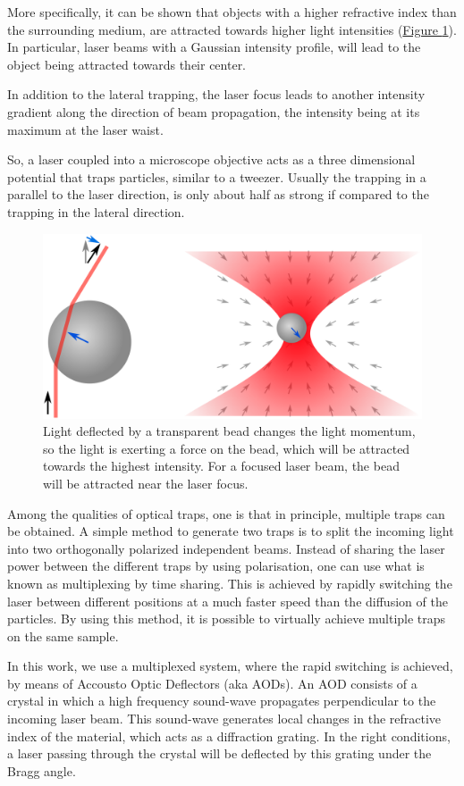 \documentclass[A4paperpaper,11pt,english]{sphinxmanual}
\begin{document}
More specifically, it can be shown that objects with a higher refractive
index than the surrounding medium, are attracted towards higher light intensities
(\hyperref[parts/part1:setup]{Figure  \ref*{parts/part1:setup}}).  In particular, laser beams with a Gaussian intensity
profile, will lead to the object being attracted towards their center.

In addition to the lateral trapping, the laser focus leads to
another intensity gradient along the direction of beam propagation, the intensity being at its maximum at the laser waist.

So, a laser coupled into a microscope objective acts as a three dimensional
potential that traps particles, similar to a tweezer. Usually the trapping in
a parallel to the laser direction, is only about half as strong if compared to the trapping in the
lateral direction.
\begin{figure}[htbp]
\centering
\capstart

\includegraphics[width=0.700\linewidth]{ot1.png}
\caption{Light deflected by a transparent bead changes the light momentum, so the
light is exerting a force on the bead, which will be attracted towards
the highest intensity.  For a focused laser beam, the bead will be attracted
near the laser focus.}\label{parts/part1:setup}\end{figure}

Among the qualities of optical traps, one is that in principle, multiple traps can be
obtained. A simple method to generate two traps is to split the incoming light
into two orthogonally polarized independent beams.  Instead of sharing the
laser power between the different traps by using polarisation, one can use what
is known as multiplexing by time sharing. This is achieved by rapidly switching the laser
between different positions at a much faster speed than the diffusion of the particles. By using this method,
it is possible to virtually achieve multiple traps on the same
sample.

In this work, we use a multiplexed system, where the rapid switching is achieved, by means of Accousto Optic Deflectors
(aka AODs).  An AOD consists of a crystal in which a high frequency
sound-wave propagates perpendicular to the incoming laser beam. This sound-wave generates local changes in the
refractive index of the material, which acts as a diffraction grating. In
the right conditions, a laser passing through the crystal will
be deflected by this grating under the Bragg angle.
\end{document}
